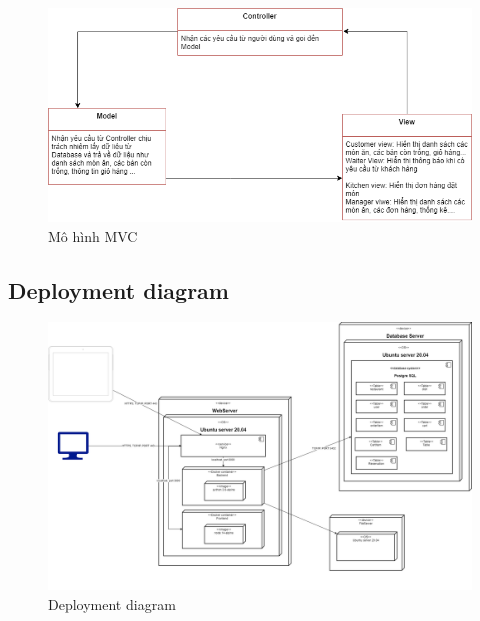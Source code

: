 \begin{figure}[!h]
    \begin{center}
        \includegraphics[scale=0.5]{Images/MVC.png}
    \end{center}
    \caption{Mô hình MVC}
\end{figure}
\newpage
\subsection{Deployment diagram}
\begin{figure}[!h]
    \begin{center}
        \includegraphics[scale=0.2]{Images/deploymet/SE_UML-deployment_diagram.png}
    \end{center}
    \caption{Deployment diagram}
\end{figure}
